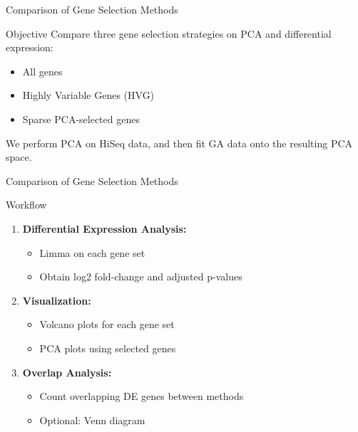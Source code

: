 \documentclass[12pt, aspectratio=43]{beamer}
\begin{document}
		
	\begin{frame}{Comparison of Gene Selection Methods}
		
		\begin{block}{Objective}
			Compare three gene selection strategies on PCA and differential expression:
			\begin{itemize}
				\item All genes
				\item Highly Variable Genes (HVG)
				\item Sparse PCA-selected genes
			\end{itemize}
			We perform PCA on HiSeq data, and then fit GA data onto the resulting PCA space.
		\end{block}
		
		\end{frame}
		
		\begin{frame}{Comparison of Gene Selection Methods}
		
		\begin{block}{Workflow}
			\begin{enumerate}
				\item \textbf{Differential Expression Analysis:} 
				\begin{itemize}
					\item Limma on each gene set
					\item Obtain log2 fold-change and adjusted p-values
				\end{itemize}
				
				\item \textbf{Visualization:}
				\begin{itemize}
					\item Volcano plots for each gene set
					\item PCA plots using selected genes
				\end{itemize}
				
				\item \textbf{Overlap Analysis:}
				\begin{itemize}
					\item Count overlapping DE genes between methods
					\item Optional: Venn diagram
				\end{itemize}
			\end{enumerate}
		\end{block}
		
		\end{frame}
		
\end{document}

